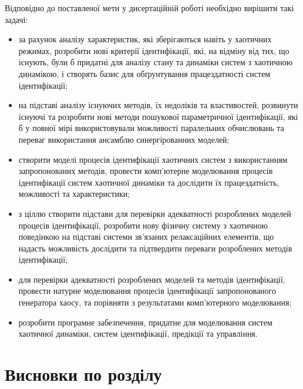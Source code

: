 Відповідно до поставленої мети у дисертаційній роботі необхідно
вирішити такі задачі:

\begin{itemize}

  \item
    за рахунок аналізу характеристик, які зберігаються навіть
    у хаотичних режимах,
    розробити нові критерії ідентифікації, які, на відміну від тих, що
    існують, були б придатні для аналізу стану та динаміки
    систем з хаотичною динамікою, і створять базис для обґрунтування працездатності систем
    ідентифікації;

  \item
    на підставі аналізу існуючих методів, їх недоліків та властивостей,
    розвинути існуючі та розробити нові методи пошукової параметричної ідентифікації,
    які б у повної мірі використовували можливості
    паралельних обчислювань та переваг використання ансамблю
    синергірованних моделей;


  \item
    створити моделі процесів
    ідентифікації хаотичних систем з використанням запропонованих методів,
    провести комп'ютерне моделювання процесів ідентифікації систем
    хаотичної динаміки та дослідити їх працездатність, можливості та
    характеристики;

  \item
    з ціллю створити підстави для перевірки адекватності розроблених
    моделей процесів ідентифікації,
    розробити нову фізичну систему з хаотичною поведінкою
    на підставі системи зв'язаних релаксаційних елементів,
    що надасть можливість дослідити та підтвердити переваги
    розроблених методів ідентифікації;

  \item
    для перевірки адекватності розроблених моделей та методів ідентифікації,
    провести натурне моделювання процесів ідентифікації запропонованого
    генератора хаосу, та порівняти з результатами комп'ютерного моделювання;

  \item
    розробити програмне забезпечення, придатне для моделювання систем
    хаотичної динаміки, систем ідентифікації, предікції та управління.

\end{itemize}




\section{Висновки по розділу \thechapter}%


